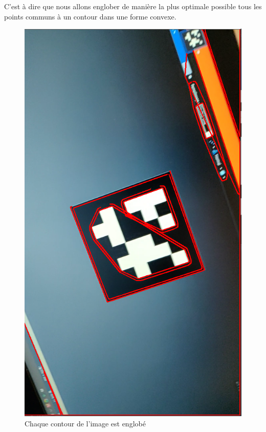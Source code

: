         C'est à dire que nous allons englober de manière la plus optimale possible tous les points communs à un contour dans une forme convexe.

        \begin{figure}[!h]
            \centering
            \includegraphics[scale=0.25]{img/convex_hull.png}
            \caption{Chaque contour de l'image est englobé}
        \end{figure}

